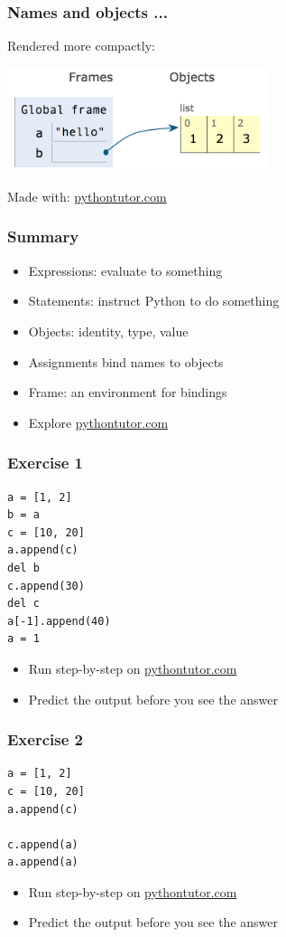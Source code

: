 \documentclass[14pt,compress,aspectratio=169]{beamer}
\begin{document}
\begin{frame}[fragile]
  \frametitle{Names and objects ...}
  Rendered more compactly:
  \vspace*{0.25in}
  \begin{center}
    \includegraphics[width=3in]{data/a_str_b_list_compact.png}
  \end{center}
  \vspace*{0.5in}
  {\small Made with: \url{pythontutor.com}}
\end{frame}

\begin{frame}
  \frametitle{Summary}
  \begin{itemize}
  \item Expressions: evaluate to something
  \item Statements: instruct Python to do something
  \item Objects: identity, type, value
  \item Assignments bind names to objects
  \item Frame: an environment for bindings
  \item Explore \url{pythontutor.com}
  \end{itemize}
\end{frame}

\begin{frame}[fragile]
  \frametitle{Exercise 1}
  \vspace*{-0.1in}
\begin{lstlisting}
a = [1, 2]
b = a
c = [10, 20]
a.append(c)
del b
c.append(30)
del c
a[-1].append(40)
a = 1
\end{lstlisting}
\vspace*{0.1in}
  \begin{itemize}
  \item Run step-by-step on \url{pythontutor.com}
  \item Predict the output before you see the answer
  \end{itemize}
\end{frame}

\begin{frame}[fragile]
  \frametitle{Exercise 2}
\begin{lstlisting}
a = [1, 2]
c = [10, 20]
a.append(c)

c.append(a)
a.append(a)
\end{lstlisting}
\vspace*{0.1in}

  \begin{itemize}
  \item Run step-by-step on \url{pythontutor.com}
  \item Predict the output before you see the answer
  \end{itemize}
\end{frame}
\end{document}
